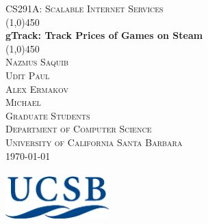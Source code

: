 \documentclass{report}
\begin{document}
\begin{titlepage}
	\begin{center}
		\textsc{\normalsize{CS291A: Scalable Internet Services}}\\[0.5cm]
		\line(1,0){450}\\[0.25in]
		\huge{\bfseries gTrack: Track Prices of Games on Steam}\\[2mm]
		\line(1,0){450}\\[1.5cm]
		\textsc{\LARGE Nazmus Saquib}\\
		\textsc{\LARGE Udit Paul}\\
		\textsc{\LARGE Alex Ermakov}\\
		\textsc{\LARGE Michael}\\[0.75cm]
		\textsc{\large Graduate Students}\\[0.75cm]
		\textsc{\large Department of Computer Science}\\
		\textsc{\large University of California Santa Barbara}\\[0.75cm]
		\textsc{\large\today}\\[2.0cm]
		~\\[2.0cm]
		\includegraphics[width=0.3\textwidth]{ucsb-logo.png}
	\end{center}
\end{titlepage}

\tableofcontents
\newpage










\end{document}
